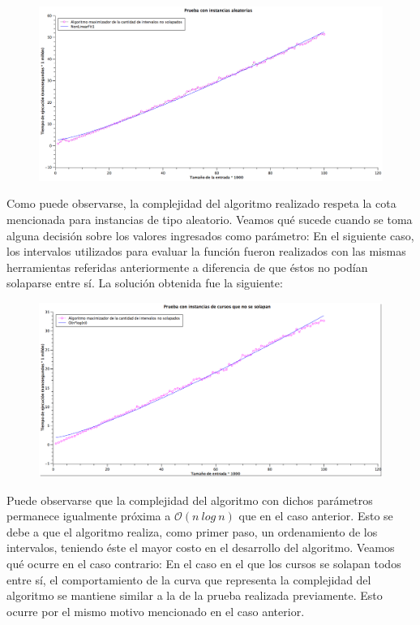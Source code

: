 \begin{figure}[H] %
\begin{center}
\includegraphics[width=460pt]{../imgs/graficoej2_aleatorios.png}
\end{center}
\end{figure}

Como puede observarse, la complejidad del algoritmo realizado respeta la cota mencionada para instancias de tipo aleatorio. Veamos qué sucede cuando se toma alguna decisión sobre los valores ingresados como parámetro:\newline
\newline
En el siguiente caso, los intervalos utilizados para evaluar la función fueron realizados con las mismas herramientas referidas anteriormente a diferencia de que éstos no podían solaparse entre sí. La solución obtenida fue la siguiente:
\begin{figure}[H] %
\begin{center}
\includegraphics[width=460pt]{../imgs/graficoej2_distintos.png}
\end{center}
\end{figure}
Puede observarse que la complejidad del algoritmo con dichos parámetros permanece igualmente próxima a $\mathcal{O}(n\ log\ n)$ que en el caso anterior. Esto se debe a que el algoritmo realiza, como primer paso, un ordenamiento de los intervalos, teniendo éste el mayor costo en el desarrollo del algoritmo. Veamos qué ocurre en el caso contrario:\newline
\newline
En el caso en el que los cursos se solapan todos entre sí, el comportamiento de la curva que representa la complejidad del algoritmo se mantiene similar a la de la prueba realizada previamente. Esto ocurre por el mismo motivo mencionado en el caso anterior.

